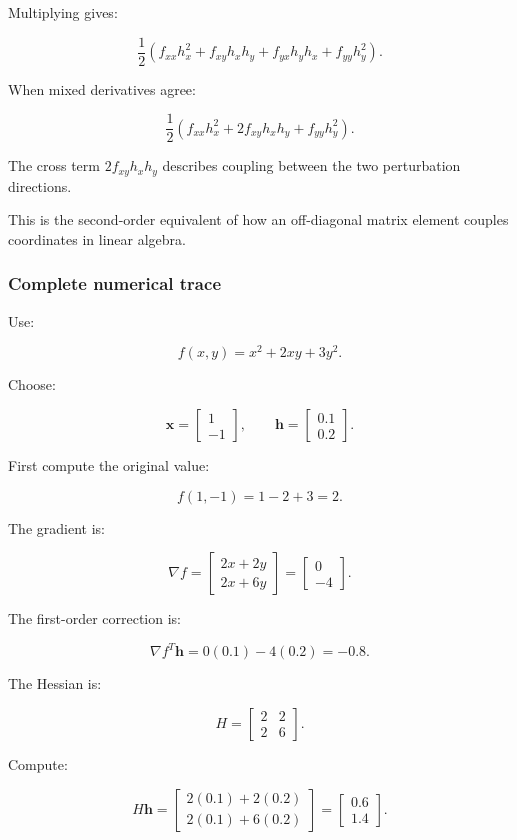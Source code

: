 Multiplying gives:

\[
\frac12\left( f_{xx}h_x^2+ f_{xy}h_xh_y+ f_{yx}h_yh_x+ f_{yy}h_y^2 \right).
\]

When mixed derivatives agree:

\[
\boxed{ \frac12\left( f_{xx}h_x^2+ 2f_{xy}h_xh_y+ f_{yy}h_y^2 \right) }.
\]

The cross term \(2f_{xy}h_xh_y\) describes coupling between the two perturbation directions.

This is the second-order equivalent of how an off-diagonal matrix element couples coordinates in linear algebra.

\subsubsection{Complete numerical trace}\label{02-foundations-ii-ch021-complete-numerical-trace}

Use:

\[
f(x,y)=x^2+2xy+3y^2.
\]

Choose:

\[
\mathbf x= \begin{bmatrix} 1\\-1 \end{bmatrix}, \qquad \mathbf h= \begin{bmatrix} 0.1\\0.2 \end{bmatrix}.
\]

First compute the original value:

\[
f(1,-1)=1-2+3=2.
\]

The gradient is:

\[
\nabla f= \begin{bmatrix} 2x+2y\\ 2x+6y \end{bmatrix} = \begin{bmatrix} 0\\-4 \end{bmatrix}.
\]

The first-order correction is:

\[
\nabla f^T\mathbf h =0(0.1)-4(0.2)=-0.8.
\]

The Hessian is:

\[
H= \begin{bmatrix} 2&2\\2&6 \end{bmatrix}.
\]

Compute:

\[
H\mathbf h= \begin{bmatrix} 2(0.1)+2(0.2)\\ 2(0.1)+6(0.2) \end{bmatrix} = \begin{bmatrix} 0.6\\1.4 \end{bmatrix}.
\]

